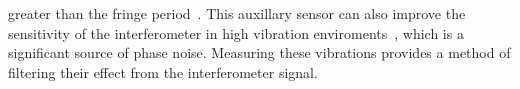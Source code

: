 greater than the fringe period~\cite{Merlet2009}. This auxillary sensor can also
improve the sensitivity of the interferometer in high vibration
enviroments~\cite{Lautier2014}, which is a significant source of phase
noise. Measuring these vibrations provides a method of filtering their
effect from the interferometer signal. 
